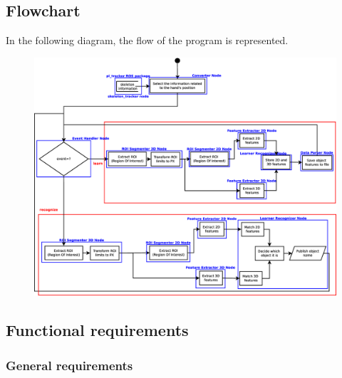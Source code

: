 \subsection{Flowchart}
In the following diagram, the flow of the program is represented. 
\begin{figure}[H]
\begin{center}
\includegraphics[width=\textwidth]{img/diagrams/flowcharts.eps}
\end{center}
\end{figure}





\subsection{Functional requirements}

\subsubsection{General requirements}

